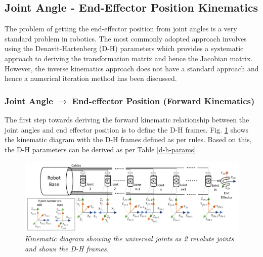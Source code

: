 \documentclass[a4paper,12pt]{report}
\begin{document}
\subsection{Joint Angle - End-Effector Position Kinematics}
The problem of getting the end-effector position from joint angles is a very standard problem in robotics. The most commonly adopted approach involves using the Denavit-Hartenberg (D-H) parameters which provides a systematic approach to deriving the transformation matrix and hence the Jacobian matrix. However, the inverse kinematics approach does not have a standard approach and hence a numerical iteration method has been discussed.
\subsubsection{Joint Angle \textbf{$\longrightarrow$} End-effector Position (Forward Kinematics)}
\label{forward-jointangle} 
The first step towards deriving the forward kinematic relationship between the joint angles and end effector position is to define the D-H frames. Fig. \ref{kinematic-diagram} shows the kinematic diagram with the D-H frames defined as per rules. Based on this, the D-H parameters can be derived as per Table \ref{d-h-params}
\begin{figure}[H]
	\centering
	\includegraphics[width=\textwidth]{images/Kinematic-diagram.png}
	\caption{\textit{Kinematic diagram showing the universal joints as 2 revolute joints and shows the D-H frames.}}
	\label{kinematic-diagram}
\end{figure}
\end{document}
